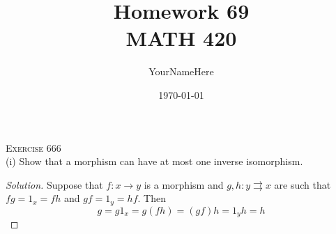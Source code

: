 \documentclass{article}
\title{Homework 69 \\
\large MATH 420}
\author{YourNameHere}
\date{\today}
\newenvironment{solution}{\begin{proof}[Solution]}{\end{proof}}
\begin{document}
\maketitle

\large 
\vspace{0.05in}
\noindent \textsc{Exercise} 666 \\
(i) Show that a morphism can have at most one inverse isomorphism. 
\begin{solution}
    Suppose that $f: x \to y$ is a morphism and $g,h: y \rightrightarrows x$ are such that $fg= 1_x = fh$ and $gf = 1_y = hf$. Then
    \[
        g = g 1_x = g (fh) = (gf) h = 1_y h = h
    \]
\end{solution}
\end{document}
